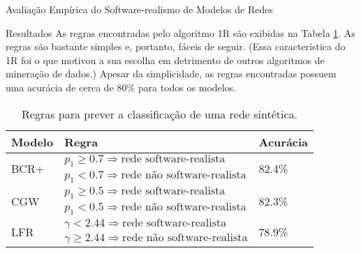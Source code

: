 \begin{section}{Avaliação Empírica do Software-realismo de Modelos de Redes}
\begin{subsection}{Resultados}
As regras encontradas pelo algoritmo 1R são exibidas na Tabela \ref{tab:rules}. As regras são bastante simples e, portanto, fáceis de seguir. (Essa característica do 1R foi o que motivou a sua escolha em detrimento de outros algoritmos de mineração de dados.) Apesar da simplicidade, as regras encontradas possuem uma acurácia de cerca de 80\% para todos os modelos.

\begin{table}
\caption{Regras para prever a classificação de uma rede sintética.}
\centering
\begin{tabular}{|l|l|l|}
\hline
Modelo & Regra & Acurácia \\
\hline 
\hline
\multirow{2}{*}{BCR+}
     & $p_1 \ge 0.7 \Rightarrow \mbox{rede software-realista}$ & \multirow{2}{*}{82.4\%}  \\ 
     & $p_1 < 0.7 \Rightarrow \mbox{rede não software-realista}$ & \\ 
\hline
\multirow{2}{*}{CGW}
     & $p_1 \ge 0.5 \Rightarrow \mbox{rede software-realista}$ & \multirow{2}{*}{82.3\%} \\  
     & $p_1 < 0.5 \Rightarrow \mbox{rede não software-realista}$ & \\  
\hline
\multirow{2}{*}{LFR}   
     & $\gamma < 2.44 \Rightarrow \mbox{rede software-realista}$ & \multirow{2}{*}{78.9\%} \\ 
     & $\gamma \ge 2.44 \Rightarrow \mbox{rede não software-realista}$ & \\ 
\hline
\end{tabular}
\label{tab:rules}
\end{table}

\end{subsection}

\end{section}


 
% 
% 
% 
% 
% 
% 
% 
% 
% 
